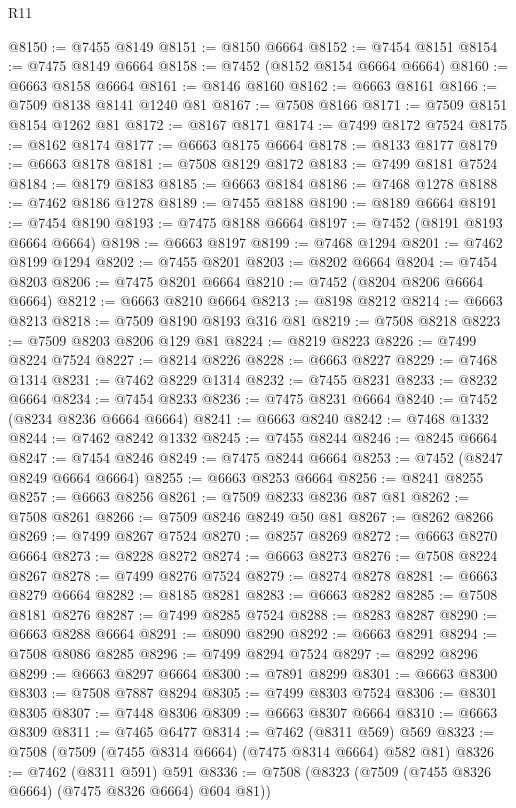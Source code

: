 \begin{lexlean}{R11}
\begin{coremodule}
{{{{{{{{{{{{{{{{{{{{{{{{{{{{{{{{{{{{{{{{{{{{{{{{{{{{{{{{{{{{{{{{{{{{{{{{{{{{{{{{{{@8150 := @7455 @8149
@8151 := @8150 @6664
@8152 := @7454 @8151
@8154 := @7475 @8149 @6664
@8158 := @7452 (@8152 @8154 @6664 @6664)
@8160 := @6663 @8158 @6664
@8161 := @8146 @8160
@8162 := @6663 @8161
@8166 := @7509 @8138 @8141 @1240 @81
@8167 := @7508 @8166
@8171 := @7509 @8151 @8154 @1262 @81
@8172 := @8167 @8171
@8174 := @7499 @8172 @7524
@8175 := @8162 @8174
@8177 := @6663 @8175 @6664
@8178 := @8133 @8177
@8179 := @6663 @8178
@8181 := @7508 @8129 @8172
@8183 := @7499 @8181 @7524
@8184 := @8179 @8183
@8185 := @6663 @8184
@8186 := @7468 @1278
@8188 := @7462 @8186 @1278
@8189 := @7455 @8188
@8190 := @8189 @6664
@8191 := @7454 @8190
@8193 := @7475 @8188 @6664
@8197 := @7452 (@8191 @8193 @6664 @6664)
@8198 := @6663 @8197
@8199 := @7468 @1294
@8201 := @7462 @8199 @1294
@8202 := @7455 @8201
@8203 := @8202 @6664
@8204 := @7454 @8203
@8206 := @7475 @8201 @6664
@8210 := @7452 (@8204 @8206 @6664 @6664)
@8212 := @6663 @8210 @6664
@8213 := @8198 @8212
@8214 := @6663 @8213
@8218 := @7509 @8190 @8193 @316 @81
@8219 := @7508 @8218
@8223 := @7509 @8203 @8206 @129 @81
@8224 := @8219 @8223
@8226 := @7499 @8224 @7524
@8227 := @8214 @8226
@8228 := @6663 @8227
@8229 := @7468 @1314
@8231 := @7462 @8229 @1314
@8232 := @7455 @8231
@8233 := @8232 @6664
@8234 := @7454 @8233
@8236 := @7475 @8231 @6664
@8240 := @7452 (@8234 @8236 @6664 @6664)
@8241 := @6663 @8240
@8242 := @7468 @1332
@8244 := @7462 @8242 @1332
@8245 := @7455 @8244
@8246 := @8245 @6664
@8247 := @7454 @8246
@8249 := @7475 @8244 @6664
@8253 := @7452 (@8247 @8249 @6664 @6664)
@8255 := @6663 @8253 @6664
@8256 := @8241 @8255
@8257 := @6663 @8256
@8261 := @7509 @8233 @8236 @87 @81
@8262 := @7508 @8261
@8266 := @7509 @8246 @8249 @50 @81
@8267 := @8262 @8266
@8269 := @7499 @8267 @7524
@8270 := @8257 @8269
@8272 := @6663 @8270 @6664
@8273 := @8228 @8272
@8274 := @6663 @8273
@8276 := @7508 @8224 @8267
@8278 := @7499 @8276 @7524
@8279 := @8274 @8278
@8281 := @6663 @8279 @6664
@8282 := @8185 @8281
@8283 := @6663 @8282
@8285 := @7508 @8181 @8276
@8287 := @7499 @8285 @7524
@8288 := @8283 @8287
@8290 := @6663 @8288 @6664
@8291 := @8090 @8290
@8292 := @6663 @8291
@8294 := @7508 @8086 @8285
@8296 := @7499 @8294 @7524
@8297 := @8292 @8296
@8299 := @6663 @8297 @6664
@8300 := @7891 @8299
@8301 := @6663 @8300
@8303 := @7508 @7887 @8294
@8305 := @7499 @8303 @7524
@8306 := @8301 @8305
@8307 := @7448 @8306
@8309 := @6663 @8307 @6664
@8310 := @6663 @8309
@8311 := @7465 @6477
@8314 := @7462 (@8311 @569) @569
@8323 := @7508 (@7509 (@7455 @8314 @6664) (@7475 @8314 @6664) @582 @81)
@8326 := @7462 (@8311 @591) @591
@8336 := @7508 (@8323 (@7509 (@7455 @8326 @6664) (@7475 @8326 @6664) @604 @81))
}}}}}}}}}}}}}}}}}}}}}}}}}}}}}}}}}}}}}}}}}}}}}}}}}}}}}}}}}}}}}}}}}}}}}}}}}}}}}}}}}}
\end{coremodule}
\end{lexlean}
